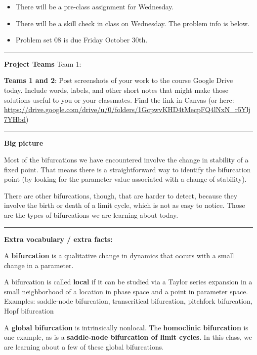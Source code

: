 \documentclass[12pt,letterpaper,noanswers]{exam}
\begin{document}
 \pdfpageheight 11in 
  \pdfpagewidth 8.5in

\noindent 




\begin{itemize}
\item There will be a pre-class assignment for Wednesday.
\item There will be a skill check in class on Wednesday.  The problem info is below.
\item Problem set 08 is due Friday October 30th.
\end{itemize}

\hrule
\vspace{0.2cm}



\noindent\textbf{Project Teams}
Team 1:


\noindent \textbf{Teams 1 and 2}: Post screenshots of your work to the course Google Drive today.  Include words, labels, and other short notes that might make those solutions useful to you or your classmates.  Find the link in Canvas (or here: \url{https://drive.google.com/drive/u/0/folders/1GcpwvKHD4tMecpFQ4lNxN_r5Ylj7YHbd})


\vspace{0.2cm}

\hrule
\vspace{0.2cm}

\noindent\textbf{Big picture}

Most of the bifurcations we have encountered involve the change in stability of a fixed point.  That means there is a straightforward way to identify the bifurcation point (by looking for the parameter value associated with a change of stability).  

There are other bifurcations, though, that are harder to detect, because they involve the birth or death of a limit cycle, which is not as easy to notice.  Those are the types of bifurcations we are learning about today.


\vspace{0.2cm}
\hrule
\vspace{0.2cm}

\noindent \textbf{Extra vocabulary / extra facts:}
\begin{tcolorbox}
A \textbf{bifurcation} is a qualitative change in dynamics that occurs with a small change in a parameter.

A bifurcation is called \textbf{local} if it can be studied via a Taylor series expansion in a small neighborhood of a location in phase space and a point in parameter space.  Examples: saddle-node bifurcation, transcritical bifurcation, pitchfork bifurcation, Hopf bifurcation

A \textbf{global bifurcation} is intrinsically nonlocal.  The \textbf{homoclinic bifurcation} is one example, as is a \textbf{saddle-node bifurcation of limit cycles}.  In this class, we are learning about a few of these global bifurcations.

\end{tcolorbox}
\end{document}
